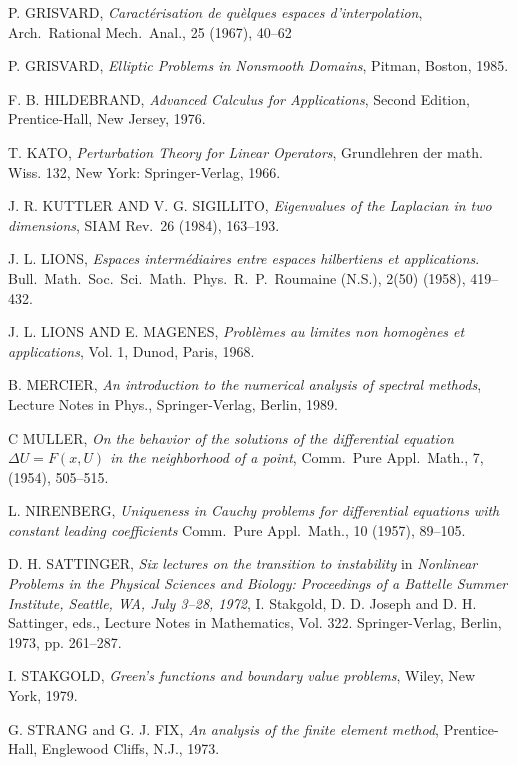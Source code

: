 \documentclass[final]{siamltex}
\numberwithin{equation}{section}
\begin{document}
\begin{thebibliography}{xxx}
 P. GRISVARD, \textit{Caract\'erisation de qu\`elques espaces d'interpolation}, Arch.\ Rational Mech.\ Anal., 25 (1967), 40--62

 P. GRISVARD, \textit{Elliptic Problems in Nonsmooth Domains}, Pitman, Boston, 1985.

 F. B. HILDEBRAND, \textit{Advanced Calculus for Applications}, Second Edition, Prentice-Hall, New Jersey, 1976.

 T. KATO, \textit{Perturbation Theory for Linear Operators}, Grundlehren der math. Wiss. 132, New York: Springer-Verlag, 1966.

 J. R. KUTTLER AND V. G. SIGILLITO, \textit{Eigenvalues of the Laplacian in two dimensions}, SIAM Rev.\ 26 (1984), 163--193.

 J. L. LIONS, \textit{
Espaces interm\'ediaires entre espaces hilbertiens et applications}. Bull.\ Math.\ Soc.\ Sci.\ Math.\ Phys.\ R.\ P.\ Roumaine (N.S.), 2(50) (1958), 419--432.

 J. L. LIONS AND E. MAGENES, \textit{Probl\`emes au limites non homog\`enes et applications}, Vol. 1, Dunod, Paris, 1968.

 B. MERCIER, \textit{An introduction to the numerical analysis of spectral methods}, Lecture Notes in Phys., Springer-Verlag, Berlin, 1989.

 C MULLER, \textit{On the behavior of the solutions of the differential equation $\Delta U=F(x,U)$ in the neighborhood of a point}, Comm.\ Pure Appl.\ Math., 7, (1954), 505--515.

 L. NIRENBERG, \textit{Uniqueness in Cauchy problems for differential equations with constant leading coefficients} Comm.\ Pure Appl.\ Math., 10 (1957), 89--105.

 D. H. SATTINGER, \textit{Six lectures on the transition to instability} in
\textit{Nonlinear Problems in the Physical Sciences and Biology: Proceedings of a Battelle Summer Institute, Seattle, WA, July 3--28, 1972}, I. Stakgold, D. D. Joseph and D. H. Sattinger, eds., Lecture Notes in Mathematics, Vol. 322. Springer-Verlag, Berlin, 1973, pp. 261--287.

 I. STAKGOLD, \textit{Green's functions and boundary value problems}, Wiley, New York, 1979.

 G. STRANG and G. J. FIX, \textit{An analysis of the finite element method}, Prentice-Hall, Englewood Cliffs, N.J., 1973.


\end{thebibliography}
\end{document}

